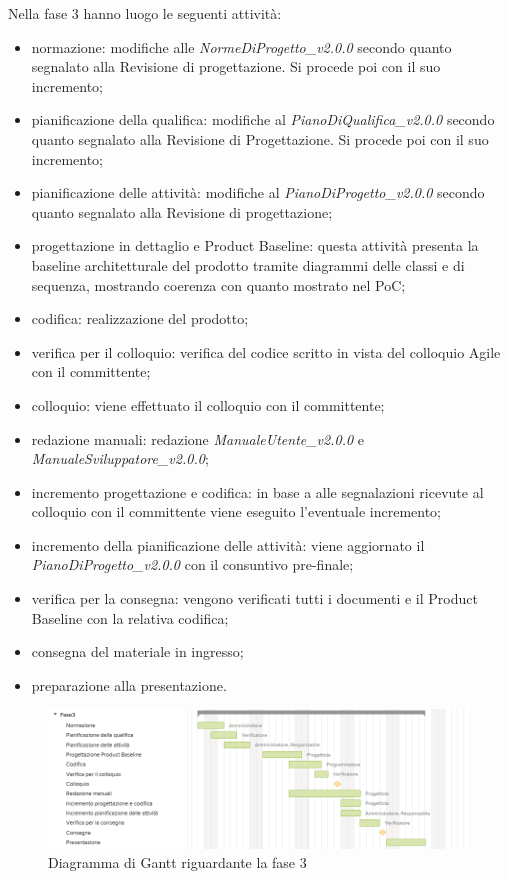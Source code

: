 Nella fase 3 hanno luogo le seguenti attività:
\begin{itemize}
	\item normazione: modifiche alle \textit{NormeDiProgetto\_v2.0.0} secondo quanto segnalato alla Revisione di progettazione. Si procede poi con il suo incremento;
	\item pianificazione della qualifica: modifiche al \textit{PianoDiQualifica\_v2.0.0} secondo quanto segnalato alla Revisione di Progettazione. Si procede poi con il suo incremento;
	\item pianificazione delle attività: modifiche al \textit{PianoDiProgetto\_v2.0.0} secondo quanto segnalato alla Revisione di progettazione;
	\item progettazione in dettaglio e Product Baseline: questa attività presenta la baseline architetturale del prodotto tramite diagrammi delle classi e di sequenza, mostrando coerenza con quanto mostrato nel PoC;
	\item codifica: realizzazione del prodotto;
	\item verifica per il colloquio: verifica del codice scritto in vista del colloquio Agile con il committente;
	\item colloquio: viene effettuato il colloquio con il committente;
	\item redazione manuali: redazione \textit{ManualeUtente\_v2.0.0} e \textit{ManualeSviluppatore\_v2.0.0};
	\item incremento progettazione e codifica: in base a alle segnalazioni ricevute al colloquio con il committente viene eseguito l'eventuale incremento;
	\item incremento della pianificazione delle attività: viene aggiornato il \textit{PianoDiProgetto\_v2.0.0} con il consuntivo pre-finale;
	\item verifica per la consegna: vengono verificati tutti i documenti e il Product Baseline con la relativa codifica;
	\item consegna del materiale in ingresso;
	\item preparazione alla presentazione.
\end{itemize}

\begin{figure}[h]
	\centering
	\includegraphics[scale=0.70]{images/fase3.png}
	\caption{Diagramma di Gantt riguardante la fase 3}
\end{figure}